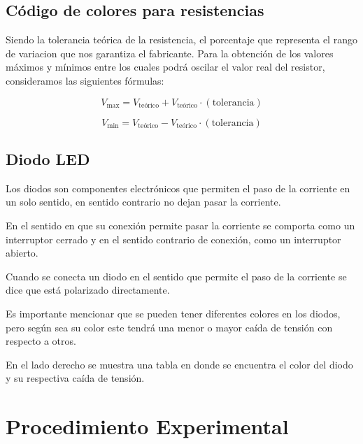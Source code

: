 \documentclass{article}
\begin{document}
    \subsection*{Código de colores para resistencias}


    Siendo la tolerancia teórica de la resistencia, el porcentaje que representa el rango de variacion que nos garantiza el fabricante. Para la obtención de los valores máximos y mínimos entre los cuales podrá oscilar el valor real del resistor, consideramos las siguientes fórmulas:

    \[
        V_{\text{max}} = V_{\text{teórico}} + V_{\text{teórico}} \cdot (\text{tolerancia})
    \]

    \[
        V_{\text{min}} = V_{\text{teórico}} - V_{\text{teórico}} \cdot (\text{tolerancia})
    \]

    \subsection*{Diodo LED}
    

    Los diodos son componentes electrónicos que permiten el paso de la corriente en un solo sentido, en sentido contrario no dejan pasar la corriente.

    En el sentido en que su conexión permite pasar la corriente se comporta como un interruptor cerrado y en el sentido contrario de conexión, como un interruptor abierto.

    
    
    Cuando se conecta un diodo en el sentido que permite el paso de la corriente se dice que está polarizado directamente.
    
    Es importante mencionar que se pueden tener diferentes colores en los diodos, pero según sea su color este tendrá una menor o mayor caída de tensión con respecto a otros.
    
    En el lado derecho se muestra una tabla en donde se encuentra el color del diodo y su respectiva caída de tensión.
    

    \section{Procedimiento Experimental}
\end{document}
